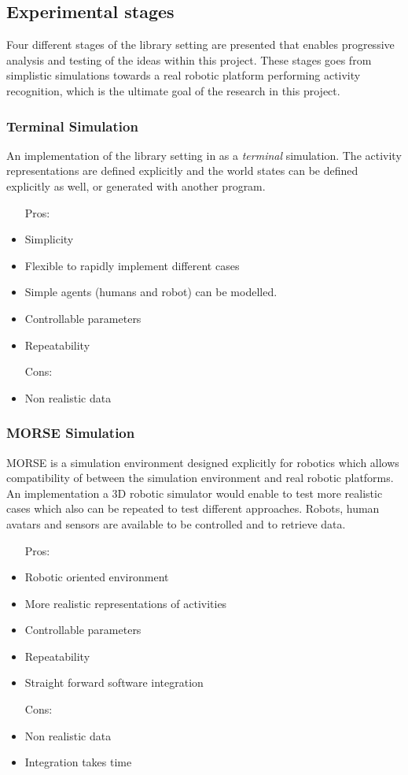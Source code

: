 \subsection{Experimental stages}

Four different stages of the library setting are presented that enables progressive analysis and testing of the ideas within this project. These stages goes from simplistic simulations towards a real robotic platform performing activity recognition, which is the ultimate goal of the research in this project.


\subsubsection{Terminal Simulation}
An implementation of the library setting in as a \textit{terminal} simulation.
The activity representations are defined explicitly and the world states can be defined explicitly as well, or generated with another program.
\begin{itemize}
\item[Pros:]
\item Simplicity
\item Flexible to rapidly implement different cases
\item Simple agents (humans and robot) can be modelled.
\item Controllable parameters
\item Repeatability
\end{itemize}
\begin{itemize}
\item[Cons:]
\item Non realistic data
\end{itemize}

\subsubsection{MORSE Simulation}
MORSE is a simulation environment designed explicitly for robotics which allows compatibility of between the simulation environment and real robotic platforms. An implementation a 3D robotic simulator would enable to test more realistic cases which also can be repeated to test different approaches. Robots, human avatars and sensors are available to be controlled and to retrieve data. 

\begin{itemize}
\item[Pros:]
\item Robotic oriented environment
\item More realistic representations of activities
\item Controllable parameters
\item Repeatability
\item Straight forward software integration
\end{itemize}
\begin{itemize}
\item[Cons:]
\item Non realistic data
\item Integration takes time
\end{itemize}


